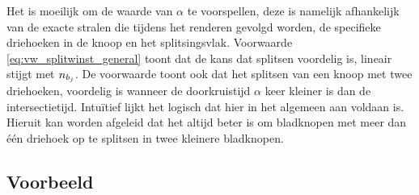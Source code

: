 Het is moeilijk om de waarde van $\alpha$ te voorspellen, deze is namelijk afhankelijk van de exacte stralen die tijdens het renderen gevolgd worden, de specifieke driehoeken in de knoop en het splitsingsvlak. 
Voorwaarde \ref{eq:vw_splitwinst_general} toont dat de kans dat splitsen voordelig is, lineair stijgt met $n_{b_j}$. 
De voorwaarde toont ook dat het splitsen van een knoop met twee driehoeken, voordelig is wanneer de doorkruistijd $\alpha$ keer kleiner is dan de intersectietijd. 
Intuïtief lijkt het logisch dat hier in het algemeen aan voldaan is. 
Hieruit kan worden afgeleid dat het altijd beter is om bladknopen met meer dan één driehoek op te splitsen in twee kleinere bladknopen.\\

\subsection{Voorbeeld}

